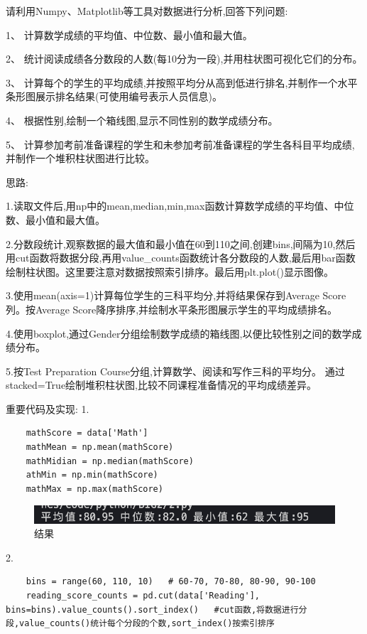 \documentclass[12pt,a4paper,oneside]{article}
\begin{document}
请利用Numpy、Matplotlib等工具对数据进行分析,回答下列问题:

1、 计算数学成绩的平均值、中位数、最小值和最大值。

2、 统计阅读成绩各分数段的人数(每10分为一段),并用柱状图可视化它们的分布。

3、 计算每个的学生的平均成绩,并按照平均分从高到低进行排名,并制作一个水平条形图展示排名结果(可使用编号表示人员信息)。

4、 根据性别,绘制一个箱线图,显示不同性别的数学成绩分布。

5、 计算参加考前准备课程的学生和未参加考前准备课程的学生各科目平均成绩,并制作一个堆积柱状图进行比较。

思路:

1.读取文件后,用np中的mean,median,min,max函数计算数学成绩的平均值、中位数、最小值和最大值。

2.分数段统计,观察数据的最大值和最小值在60到110之间,创建bins,间隔为10,然后用cut函数将数据分段,再用value\_counts函数统计各分数段的人数,最后用bar函数绘制柱状图。这里要注意对数据按照索引排序。最后用plt.plot()显示图像。

3.使用mean(axis=1)计算每位学生的三科平均分,并将结果保存到Average Score列。按Average Score降序排序,并绘制水平条形图展示学生的平均成绩排名。

4.使用boxplot,通过Gender分组绘制数学成绩的箱线图,以便比较性别之间的数学成绩分布。

5.按Test Preparation Course分组,计算数学、阅读和写作三科的平均分。
通过stacked=True绘制堆积柱状图,比较不同课程准备情况的平均成绩差异。

重要代码及实现:
1.
\begin{lstlisting}
    mathScore = data['Math']
    mathMean = np.mean(mathScore)
    mathMidian = np.median(mathScore)
    athMin = np.min(mathScore)
    mathMax = np.max(mathScore)
\end{lstlisting}

\begin{figure}[H]
    \centering
    \begin{minipage}{0.6\textwidth}
        \centering
        \includegraphics[width=\textwidth]{image/Figure_0} %
        \caption{结果}
        \label{fig:image2}
    \end{minipage}
\end{figure}

2.\begin{lstlisting}
    bins = range(60, 110, 10)   # 60-70, 70-80, 80-90, 90-100
    reading_score_counts = pd.cut(data['Reading'], bins=bins).value_counts().sort_index()   #cut函数,将数据进行分段,value_counts()统计每个分段的个数,sort_index()按索引排序
\end{lstlisting}
\end{document}
